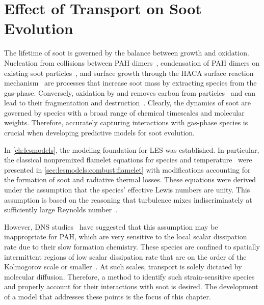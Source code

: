 \chapter{Effect of Transport on Soot Evolution\label{ch:transport}}

The lifetime of soot is governed by the balance between growth and oxidation. Nucleation from collisions between PAH dimers~\cite{blanquart2009,schuetz2002,frenklach1991,wang2011}, condensation of PAH dimers on existing soot particles~\cite{blanquart2009,hmom2009}, and surface growth through the HACA surface reaction mechanism~\cite{frenklach1985,frenklach1991} are processes that increase soot mass by extracting species from the gas-phase. Conversely, oxidation by  and  removes carbon from particles~\cite{stanmore2001,neoh1981,kazakov1995} and can lead to their fragmentation and destruction~\cite{neoh1984,mueller2011}. Clearly, the dynamics of soot are governed by species with a broad range of chemical timescales and molecular weights. Therefore, accurately capturing interactions with gas-phase species is crucial when developing predictive models for soot evolution.

In \cref{ch:lesmodels}, the modeling foundation for LES was established. In particular, the classical nonpremixed flamelet equations for species and temperature~\cite{peters1984} were presented in \cref{sec:lesmodels:combust:flamelet} with modifications accounting for the formation of soot and radiative thermal losses. These equations were derived under the assumption that the species' effective Lewis numbers are unity. This assumption is based on the reasoning that turbulence mixes indiscriminately at sufficiently large Reynolds number~\cite{pitsch19981057}.


However, DNS studies~\cite{bisetti2012,attili2014} have suggested that this assumption may be inappropriate for PAH, which are very sensitive to the local scalar dissipation rate due to their slow formation chemistry. These species are confined to spatially intermittent regions of low scalar dissipation rate that are on the order of the Kolmogorov scale or smaller~\cite{vaishnavi2008}. At such scales, transport is solely dictated by molecular diffusion. Therefore, a method to identify such strain-sensitive species and properly account for their interactions with soot is desired. The development of a model that addresses these points is the focus of this chapter.

